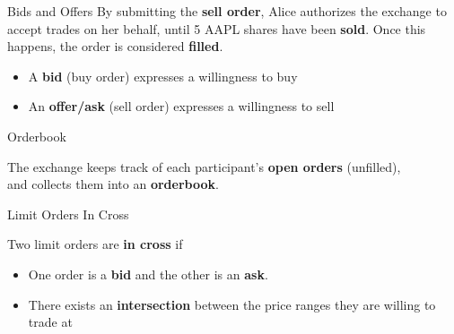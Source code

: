 \begin{frame}{Bids and Offers}
  By submitting the \textbf{sell order}, Alice authorizes the exchange to accept trades on her behalf, 
  until 5 AAPL shares have been \textbf{sold}. Once this happens, the order is considered \textbf{filled}.

  \begin{sqt:definition}
    \begin{itemize}
      \item A \textbf{bid} (buy order) expresses a willingness to buy
      \item An \textbf{offer/ask} (sell order) expresses a willingness to sell
    \end{itemize}
  \end{sqt:definition}

  \begin{center}
    
  \end{center}
\end{frame}

\begin{frame}{Orderbook}
  \begin{sqt:definition}
    The exchange keeps track of each participant's \textbf{open orders} (unfilled),\\
    and collects them into an \textbf{orderbook}.
  \end{sqt:definition}

  \begin{center}
    
  \end{center}
\end{frame}

\begin{frame}{Limit Orders In Cross}

  \begin{sqt:definition}
    Two limit orders are \textbf{in cross} if
    \begin{itemize}
      \item One order is a \textbf{bid} and the other is an \textbf{ask}.
      \item There exists an \textbf{intersection} between the price ranges they are willing to trade at
    \end{itemize}
  \end{sqt:definition}
  \begin{center}
    
  \end{center}
\end{frame}

